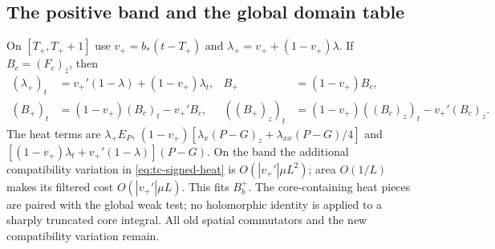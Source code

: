 \subsection{The positive band and the global domain table}
On $[T_+,T_++1]$ use $v_+=b_*(t-T_+)$ and
$\lambda_+=v_++(1-v_+)\lambda$. If $B_c=(F_c)_{\bar z}$, then
\begin{align*}
 (\lambda_+)_t&=v_+'(1-\lambda)+(1-v_+)\lambda_t,&
 B_+&=(1-v_+)B_c,\\
 (B_+)_t&=(1-v_+)(B_c)_t-v_+'B_c,&
 ((B_+)_z)_t&=(1-v_+)((B_c)_z)_t-v_+'(B_c)_z.
\end{align*}
The heat terms are $\lambda_+E_P$,
$(1-v_+)[\lambda_x(P-G)_z+\lambda_{xx}(P-G)/4]$ and
$[(1-v_+)\lambda_t+v_+'(1-\lambda)](P-G)$.
On the band the additional compatibility variation in
\eqref{eq:tc-signed-heat} is $O(|v_+'|\mu L^2)$; area $O(1/L)$
makes its filtered cost $O(|v_+'|\mu L)$. This fits $B_b^+$.
The core-containing heat pieces are paired with the global weak test;
no holomorphic identity is applied to a sharply truncated core integral.
All old spatial commutators and the new compatibility variation remain.

